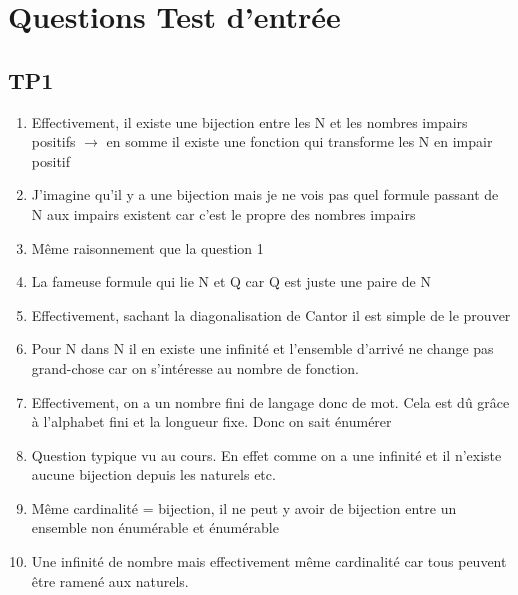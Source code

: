 \documentclass{report}
\begin{document}
\chapter{Questions Test d'entrée}

\section{TP1}
\begin{enumerate}
\item Effectivement, il existe une bijection entre les N et les nombres impairs positifs $\rightarrow$ en somme il existe une fonction qui transforme les N en impair positif
\item J'imagine qu'il y a une bijection mais je ne vois pas quel formule passant de N aux impairs existent car c'est le propre des nombres impairs 
\item Même raisonnement que la question 1
\item La fameuse formule qui lie N et Q car Q est juste une paire de N
\item Effectivement, sachant la diagonalisation de Cantor il est simple de le prouver
\item Pour N dans N il en existe une infinité et l'ensemble d'arrivé ne change pas grand-chose car on s'intéresse au nombre de fonction.
\item Effectivement, on a un nombre fini de langage donc de mot. Cela est dû grâce à l'alphabet fini et la longueur fixe. Donc on sait énumérer
\item Question typique vu au cours. En effet comme on a une infinité et il n'existe aucune bijection depuis les naturels etc.
\item Même cardinalité = bijection, il ne peut y avoir de bijection entre un ensemble non énumérable et énumérable
\item Une infinité de nombre mais effectivement même cardinalité car tous peuvent être ramené aux naturels.


\end{enumerate}
\end{document}
